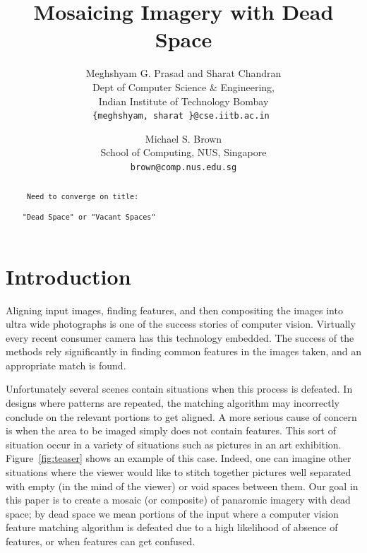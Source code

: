 \documentclass[10pt,twocolumn,letterpaper]{article}
\begin{document}
\title{Mosaicing Imagery with Dead Space}

\author{Meghshyam G. Prasad and Sharat Chandran\\
Dept of Computer Science \& Engineering, \\
Indian Institute of Technology Bombay\\
{\tt\small \{meghshyam, sharat \}@cse.iitb.ac.in }
\and
Michael S. Brown\\
School of Computing, NUS, Singapore\\
{\tt\small brown@comp.nus.edu.sg}
}

\maketitle


\begin{abstract}

{\color{red} 
\noindent \verb+ Need to converge on title: +

\noindent \verb+"Dead Space" or "Vacant Spaces"+ 

}

   
\end{abstract}

\section{Introduction}

Aligning input images, finding features, and then compositing the
images into ultra wide photographs is one of the success stories of
computer vision.  Virtually every recent consumer camera has this
technology embedded.  The success of the methods rely significantly in
finding common features in the images taken, and an appropriate match
is found.

Unfortunately several scenes contain situations when this process is
defeated.  In designs where patterns are repeated, the matching
algorithm may incorrectly conclude on the relevant portions to get
aligned.  
A more serious cause of concern is when the area to be imaged simply
does not contain features.  This sort of situation occur in a variety
of situations such as pictures in an art exhibition.
Figure~\ref{fig:teaser} shows an example of this case. Indeed, one can
imagine other situations where the viewer would like to stitch
together pictures well separated with empty (in the mind of the
viewer) or void spaces between them.  Our goal in this paper is to
create a mosaic (or composite) of panaromic imagery with dead space;
by dead space we mean portions of the input where a computer vision
feature matching algorithm is defeated due to a high likelihood of
absence of features, or when features can get confused.
\end{document}
